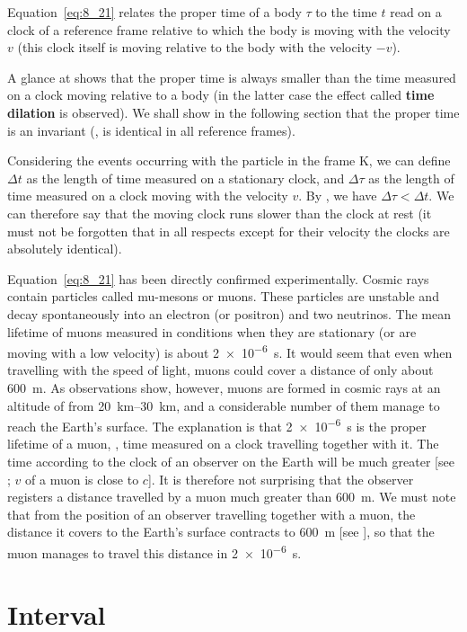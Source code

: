 Equation~\eqref{eq:8_21} relates the proper time of a body $\tau$ to the time $t$ read on a clock of a reference frame relative to which the body is moving with the velocity $v$ (this clock itself is moving relative to the body with the velocity $-v$).

A glance at  shows that the proper time is always smaller than the time measured on a clock moving relative to a body (in the latter case the effect called \textbf{time dilation} is observed). We shall show in the following section that the proper time is an invariant (\ie, is identical in all reference frames).

Considering the events occurring with the particle in the frame K, we can define $\Delta t$ as the length of time measured on a stationary clock, and $\Delta\tau$ as the length of time measured on a clock moving with the velocity $v$. By , we have $\Delta\tau<\Delta t$. We can therefore say that the moving clock runs slower than the clock at rest (it must not be forgotten that in all respects except for their velocity the clocks are absolutely identical).

Equation~\eqref{eq:8_21} has been directly confirmed experimentally. Cosmic rays contain particles called mu-mesons or muons. These particles are unstable and decay spontaneously into an electron (or positron) and two neutrinos. The mean lifetime of muons measured in conditions when they are stationary (or are moving with a low velocity) is about \SI{2e-6}{\second}. It would seem that even when travelling with the speed of light, muons could cover a distance of only about \SI{600}{\metre}. As observations show, however, muons are formed in cosmic rays at an altitude of from \SIrange{20}{30}{\kilo\metre}, and a considerable number of them manage to reach the Earth's surface. The explanation is that \SI{2e-6}{\second} is the proper lifetime of a muon, \ie, time measured on a clock travelling together with it. The time according to the clock of an observer on the Earth will be much greater [see ; $v$ of a muon is close to $c$]. It is therefore not surprising that the observer registers a distance travelled by a muon much greater than \SI{600}{\metre}. We must note that from the position of an observer travelling together with a muon, the distance it covers to the Earth's surface contracts to \SI{600}{\metre} [see ], so that the muon manages to travel this distance in \SI{2e-6}{\second}.

\section{Interval}\label{sec:8_4}

